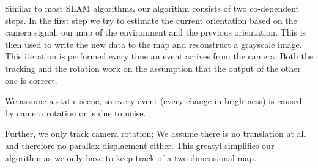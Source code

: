 Similar to most SLAM algorithms, our algorithm consists of two co-dependent
steps. In the first step we try to estimate the current orientation based on
the camera signal, our map of the environment and the previous orientation.
This is then used to write the new data to the map and reconstruct a grayscale
image. This iteration is performed every time an event arrives from the camera.
Both the tracking and the rotation work on the assumption that the output  of
the other one is correct.

We assume a static scene, so every event (every change in brightness) is caused
by camera rotation or is due to noise.

Further, we only track camera rotation; We assume there is no translation at
all and therefore no parallax displacment either. This greatyl simplifies our
algorithm as we only have to keep track of a two dimensional map.


